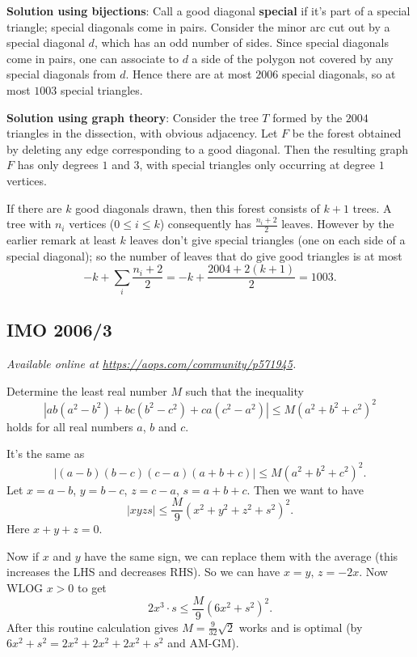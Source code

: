 \documentclass[11pt]{scrartcl}
\begin{document}
\textbf{Solution using bijections}:
Call a good diagonal \textbf{special} if it's part of a special triangle;
special diagonals come in pairs.
Consider the minor arc cut out by a special diagonal $d$,
which has an odd number of sides.
Since special diagonals come in pairs,
one can associate to $d$ a side of the polygon
not covered by any special diagonals from $d$.
Hence there are at most $2006$ special diagonals,
so at most $1003$ special triangles.

\textbf{Solution using graph theory}:
Consider the tree $T$ formed by the $2004$
triangles in the dissection, with obvious adjacency.
Let $F$ be the forest obtained by deleting
any edge corresponding to a good diagonal.
Then the resulting graph $F$ has only degrees $1$ and $3$,
with special triangles only occurring at degree $1$ vertices.

If there are $k$ good diagonals drawn,
then this forest consists of $k+1$ trees.
A tree with $n_i$ vertices ($0 \le i \le k$)
consequently has $\frac{n_i+2}{2}$ leaves.
However by the earlier remark at least $k$ leaves
don't give special triangles
(one on each side of a special diagonal);
so the number of leaves that do give good triangles is at most
\[ -k + \sum_i \frac{n_i+2}{2}
  = -k + \frac{2004 + 2(k+1)}{2} = 1003. \]
\pagebreak

\subsection{IMO 2006/3}
\textsl{Available online at \url{https://aops.com/community/p571945}.}
\begin{mdframed}[style=mdpurplebox,frametitle={Problem statement}]
Determine the least real number $M$ such that the inequality
\[ \left\lvert ab(a^2-b^2)+bc(b^2-c^2)+ca(c^2-a^2) \right\rvert
  \leq M\left( a^2+b^2+c^2 \right)^2 \]
holds for all real numbers $a$, $b$ and $c$.
\end{mdframed}
It's the same as
\[ \left\lvert (a-b)(b-c)(c-a)(a+b+c) \right\rvert
\le M \left( a^2+b^2+c^2 \right)^2. \]
Let $x=a-b$, $y=b-c$, $z=c-a$, $s=a+b+c$.
Then we want to have
\[
  \left\lvert xyzs \right\rvert
  \le \frac{M}{9} (x^2+y^2+z^2+s^2)^2.
\]
Here $x+y+z=0$.

Now if $x$ and $y$ have the same sign,
we can replace them with the average
(this increases the LHS and decreases RHS).
So we can have $x=y$, $z=-2x$.
Now WLOG $x > 0$ to get
\[ 2x^3 \cdot s \le \frac{M}{9} \left( 6x^2+s^2 \right)^2. \]
After this routine calculation gives
$M = \frac{9}{32}\sqrt2$ works and is optimal
(by $6x^2+s^2 = 2x^2 + 2x^2 + 2x^2 + s^2$ and AM-GM).
\pagebreak
\end{document}
